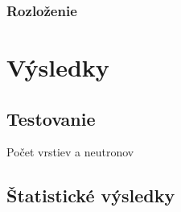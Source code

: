 \documentclass[a4paper, 11pt]{article}
\begin{document}
\subsubsection*{Rozloženie}
\section{Výsledky}
	\subsection{Testovanie}
	Počet vrstiev a neutronov
	\subsection{Štatistické výsledky}
\end{document}
